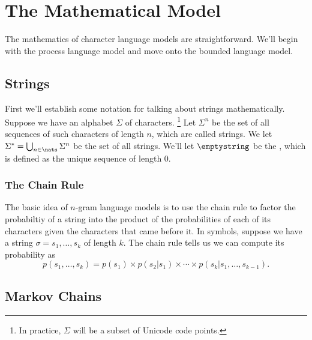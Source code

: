 \section{The Mathematical Model}\label{section:char-lm-math}

The mathematics of character language models are straightforward.
We'll begin with the process language model and move onto the
bounded language model.

\subsection{Strings}

First we'll establish some notation for talking about strings
mathematically.  Suppose we have an alphabet $\Sigma$ of characters.%
%
\footnote{In practice, $\Sigma$ will be a subset of Unicode code
  points.}
%
Let $\Sigma^n$ be the set of all sequences of such characters of
length $n$, which are called strings.  We let $\Sigma^* = \bigcup_{n
  \in \nats} \Sigma^n$ be the set of all strings.  We'll let
$\emptystring$ be the , which is defined as the
unique sequence of length 0.


\subsubsection{The Chain Rule}

The basic idea of $n$-gram language models is
to use the chain rule to factor the probabiltiy of a string into
the product of the probabilities of each of its characters given
the characters that came before it.  In symbols, suppose we have
a string $\sigma = s_1,\ldots,s_k$ of length $k$.  The
chain rule tells us we can compute its probability as
%
\begin{equation}
p(s_1,\ldots,s_k) = p(s_1) \times p(s_2|s_1) \times \cdots \times p(s_k|s_1,\ldots,s_{k-1}).
\end{equation}
%

\subsection{Markov Chains}

